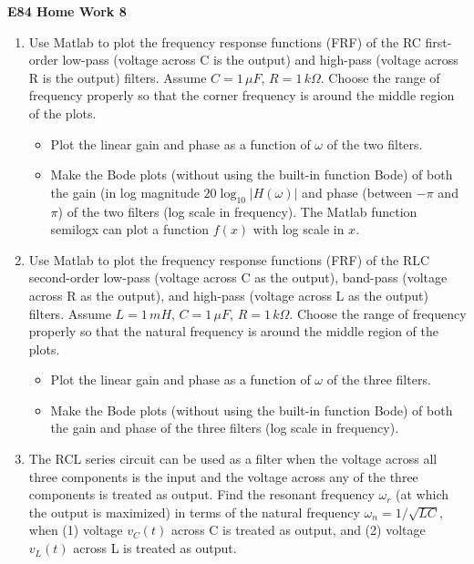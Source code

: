 \usepackage{html}

\begin{center}
{\Large \bf E84 Home Work 8}
\end{center}
\begin{enumerate}

\item Use Matlab to plot the frequency response functions (FRF) of the 
  RC first-order low-pass (voltage across C is the output) and high-pass
  (voltage across R is the output) filters. Assume $C=1\,\mu F$, 
  $R=1\,k\Omega$. Choose the range of frequency properly so that the
  corner frequency is around the middle region of the plots.
  \begin{itemize}
    \item Plot the linear gain and phase as a function of $\omega$ of 
      the two filters.
    \item Make the Bode plots (without using the built-in function Bode)
      of both the gain (in log magnitude $20\log_{10}|H(\omega)|$ and 
      phase (between $-\pi$ and $\pi$) of the two filters (log scale in 
      frequency). The Matlab function semilogx can plot a function $f(x)$
      with log scale in $x$.
  \end{itemize}

\item Use Matlab to plot the frequency response functions (FRF) of the 
  RLC second-order low-pass (voltage across C as the output), band-pass
  (voltage across R as the output), and high-pass (voltage across L as
  the output) filters. Assume $L=1\,mH$, $C=1\,\mu F$, $R=1\,k\Omega$. 
  Choose the range of frequency properly so that the natural frequency 
  is around the middle region of the plots.
  \begin{itemize}
    \item Plot the linear gain and phase as a function of $\omega$ of the 
      three filters.
    \item Make the Bode plots (without using the built-in function Bode)
      of both the gain and phase of the three filters (log scale in frequency).
  \end{itemize}

\item The RCL series circuit can be used as a filter when the voltage across
  all three components is the input and the voltage across any of the 
  three components is treated as output. Find the resonant frequency
  $\omega_r$ (at which the output is maximized) in terms of the natural
  frequency $\omega_n=1/\sqrt{LC}$, when (1) voltage $v_C(t)$ across C
  is treated as output, and (2) voltage $v_L(t)$ across L is treated as
  output.


\end{enumerate}
